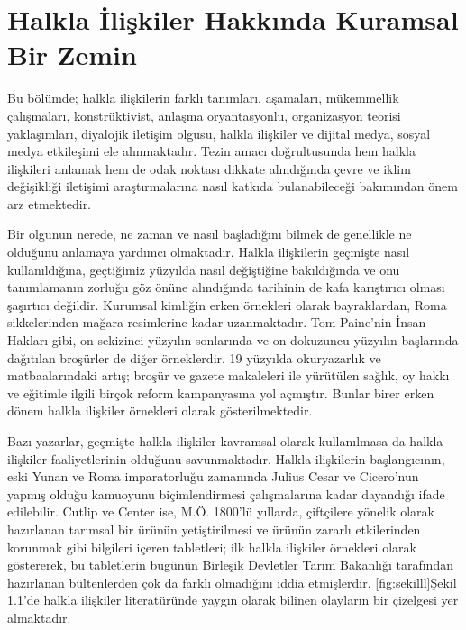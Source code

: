 \documentclass[
]{book}
\begin{document}
\hypertarget{halkla-iliux15fkiler-hakkux131nda-kuramsal-bir-zemin}{%
\section{Halkla İlişkiler Hakkında Kuramsal Bir Zemin}\label{halkla-iliux15fkiler-hakkux131nda-kuramsal-bir-zemin}}

Bu bölümde; halkla ilişkilerin farklı tanımları, aşamaları, mükemmellik çalışmaları, konstrüktivist, anlaşma oryantasyonlu, organizasyon teorisi yaklaşımları, diyalojik iletişim olgusu, halkla ilişkiler ve dijital medya, sosyal medya etkileşimi ele alınmaktadır. Tezin amacı doğrultusunda hem halkla ilişkileri anlamak hem de odak noktası dikkate alındığında çevre ve iklim değişikliği iletişimi araştırmalarına nasıl katkıda bulanabileceği bakımından önem arz etmektedir.

Bir olgunun nerede, ne zaman ve nasıl başladığını bilmek de genellikle ne olduğunu anlamaya yardımcı olmaktadır. Halkla ilişkilerin geçmişte nasıl kullanıldığına, geçtiğimiz yüzyılda nasıl değiştiğine bakıldığında ve onu tanımlamanın zorluğu göz önüne alındığında tarihinin de kafa karıştırıcı olması şaşırtıcı değildir. Kurumsal kimliğin erken örnekleri olarak bayraklardan, Roma sikkelerinden mağara resimlerine kadar uzanmaktadır. Tom Paine'nin İnsan Hakları gibi, on sekizinci yüzyılın sonlarında ve on dokuzuncu yüzyılın başlarında dağıtılan broşürler de diğer örneklerdir. 19 yüzyılda okuryazarlık ve matbaalarındaki artış; broşür ve gazete makaleleri ile yürütülen sağlık, oy hakkı ve eğitimle ilgili birçok reform kampanyasına yol açmıştır. Bunlar birer erken dönem halkla ilişkiler örnekleri olarak gösterilmektedir. \citep{theaker2016public}

Bazı yazarlar, geçmişte halkla ilişkiler kavramsal olarak kullanılmasa da halkla ilişkiler faaliyetlerinin olduğunu savunmaktadır. Halkla ilişkilerin başlangıcının, eski Yunan ve Roma imparatorluğu zamanında Julius Cesar ve Cicero'nun yapmış olduğu kamuoyunu biçimlendirmesi çalışmalarına kadar dayandığı ifade edilebilir. Cutlip ve Center ise, M.Ö. 1800'lü yıllarda, çiftçilere yönelik olarak hazırlanan tarımsal bir ürünün yetiştirilmesi ve ürünün zararlı etkilerinden korunmak gibi bilgileri içeren tabletleri; ilk halkla ilişkiler örnekleri olarak göstererek, bu tabletlerin bugünün Birleşik Devletler Tarım Bakanlığı tarafından hazırlanan bültenlerden çok da farklı olmadığını iddia etmişlerdir.\citep{peltekoglu2016halkla} \ref{fig:sekilll}Şekil 1.1'de halkla ilişkiler literatüründe yaygın olarak bilinen olayların bir çizelgesi yer almaktadır.
\end{document}

